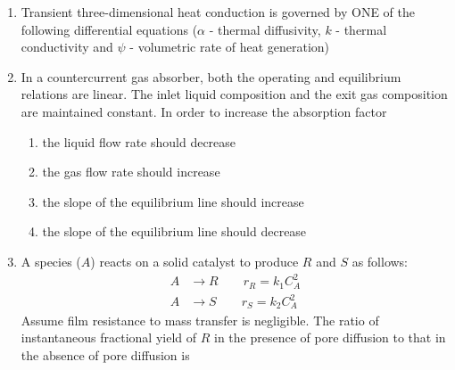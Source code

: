 \documentclass[journal,12pt,onecolumn]{IEEEtran}
\theoremstyle{remark}
\begin{document}
\begin{enumerate}
    \item Transient three-dimensional heat conduction is governed by ONE of the following differential equations ($\alpha$ - thermal diffusivity, $k$ - thermal conductivity and $\psi$ - volumetric rate of heat generation)
    \hfill{}
    \begin{enumerate}[label=(\Alph*)]
    \end{enumerate}

    \item In a countercurrent gas absorber, both the operating and equilibrium relations are linear. The inlet liquid composition and the exit gas composition are maintained constant. In order to increase the absorption factor
    \hfill{}
    \begin{enumerate}[label=(\Alph*)]
        \item the liquid flow rate should decrease
        \item the gas flow rate should increase
        \item the slope of the equilibrium line should increase
        \item the slope of the equilibrium line should decrease
    \end{enumerate}

    \item A species ($A$) reacts on a solid catalyst to produce $R$ and $S$ as follows:
    \begin{align*}
        A &\rightarrow R \qquad r_R = k_1 C_A^2 \\
        A &\rightarrow S \qquad r_S = k_2 C_A^2
    \end{align*}
    Assume film resistance to mass transfer is negligible. The ratio of instantaneous fractional yield of $R$ in the presence of pore diffusion to that in the absence of pore diffusion is
    \hfill{}
    \begin{enumerate}[label=(\Alph*)]
    \end{enumerate}


\end{enumerate}
\end{document}
